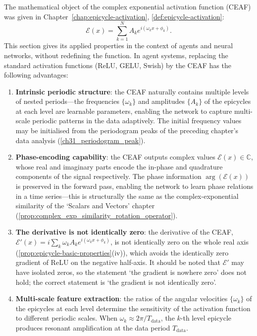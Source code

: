 \begin{definition}\label{def:eaf_agent}
The mathematical object of the complex exponential activation function (CEAF) was given in Chapter~\ref{chap:epicycle-activation}, \cref{def:epicycle-activation}:
\[
\mathcal{E}(x)=\sum_{k=1}^{N}A_k e^{i(\omega_k x+\phi_k)}.
\]
This section gives its applied properties in the context of agents and neural networks, without redefining the function. In agent systems, replacing the standard activation functions (ReLU, GELU, Swish) by the CEAF has the following advantages:
\begin{enumerate}[label=(\roman*)]
    \item \textbf{Intrinsic periodic structure}: the CEAF naturally contains multiple levels of nested periods---the frequencies $\{\omega_k\}$ and amplitudes $\{A_k\}$ of the epicycles at each level are learnable parameters, enabling the network to capture multi-scale periodic patterns in the data adaptively. The initial frequency values may be initialised from the periodogram peaks of the preceding chapter's data analysis (\cref{ch31_periodogram_peak}).
    \item \textbf{Phase-encoding capability}: the CEAF outputs complex values $\mathcal{E}(x) \in \mathbb{C}$, whose real and imaginary parts encode the in-phase and quadrature components of the signal respectively. The phase information $\arg(\mathcal{E}(x))$ is preserved in the forward pass, enabling the network to learn phase relations in a time series---this is structurally the same as the complex-exponential similarity of the `Scalars and Vectors' chapter (\cref{prop:complex_exp_similarity_rotation_operator}).
    \item \textbf{The derivative is not identically zero}: the derivative of the CEAF, $\mathcal{E}'(x) = i\sum_k \omega_k A_k e^{i(\omega_k x + \phi_k)}$, is not identically zero on the whole real axis (\cref{prop:epicycle-basic-properties}(iv)), which avoids the identically zero gradient of ReLU on the negative half-axis. It should be noted that $\mathcal{E}'$ may have isolated zeros, so the statement `the gradient is nowhere zero' does not hold; the correct statement is `the gradient is not identically zero'.
    \item \textbf{Multi-scale feature extraction}: the ratios of the angular velocities $\{\omega_k\}$ of the epicycles at each level determine the sensitivity of the activation function to different periodic scales. When $\omega_k \approx 2\pi/T_{\text{data}}$, the $k$-th level epicycle produces resonant amplification at the data period $T_{\text{data}}$.
\end{enumerate}
\end{definition}

